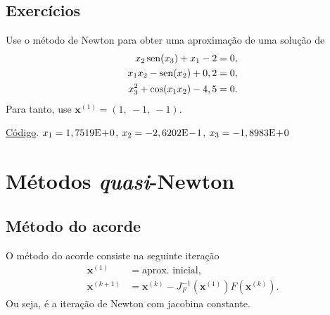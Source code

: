 \subsection*{Exercícios}

\begin{exer}\label{ex:newton_exec}
  Use o método de Newton para obter uma aproximação de uma solução de
  \begin{align}
    x_2\operatorname{sen}(x_3)+x_1-2&=0,\\
    x_1x_2-\operatorname{sen}(x_2)+0,2&=0,\\
    x_3^2+\cos(x_1x_2)-4,5&=0.
  \end{align}
Para tanto, use $\pmb{x}^{(1)} = (1,~-1,~-1)$.
\end{exer}
\begin{resp}
    \ifisoctave 
    \href{https://github.com/phkonzen/notas/blob/master/src/MatematicaNumerica/cap_snl/dados/exer_newton_exec/exer_newton_exec.m}{Código}. 
  \fi
  $x_1 = 1,7519\mathrm{E}\!+\!0$, $x_2 = -2,6202\mathrm{E}\!-\!1$, $x_3 =-1,8983\mathrm{E}\!+\!0$
\end{resp}



\section{Métodos {\it quasi}-Newton}\label{cap_snl_sec_quasi_newton}

\subsection{Método do acorde}

O método do acorde consiste na seguinte iteração
\begin{align}
  \pmb{x}^{(1)} &= \text{aprox. inicial},\\
  \pmb{x}^{(k+1)} &= \pmb{x}^{(k)} - J_F^{-1}(\pmb{x}^{(1)})F(\pmb{x}^{(k)}).
\end{align}
Ou seja, é a iteração de Newton com jacobina constante.


